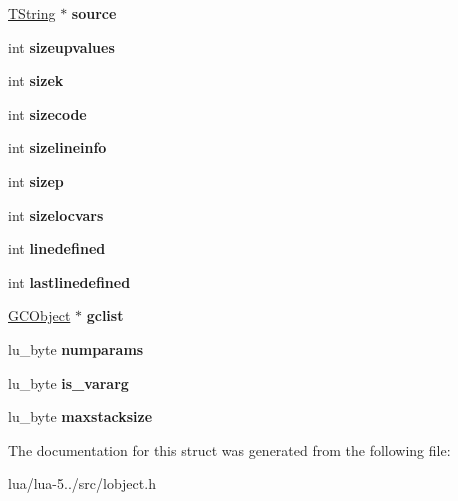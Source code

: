 \begin{DoxyCompactItemize}
\item 
\hypertarget{struct_proto_a92b6ec319e7aa1ee8b8ff7807353ad96}{\hyperlink{union_t_string}{T\+String} $\ast$ {\bfseries source}}\label{struct_proto_a92b6ec319e7aa1ee8b8ff7807353ad96}

\item 
\hypertarget{struct_proto_a6ecec897497ba7d94df6ef69289ef5c0}{int {\bfseries sizeupvalues}}\label{struct_proto_a6ecec897497ba7d94df6ef69289ef5c0}

\item 
\hypertarget{struct_proto_a5bd719e0486168f6ecd4b01bf41a7444}{int {\bfseries sizek}}\label{struct_proto_a5bd719e0486168f6ecd4b01bf41a7444}

\item 
\hypertarget{struct_proto_a43e4d3849b5859112d93bdc2534a7cc0}{int {\bfseries sizecode}}\label{struct_proto_a43e4d3849b5859112d93bdc2534a7cc0}

\item 
\hypertarget{struct_proto_a65303ae1d815313f3358a578113fcc6e}{int {\bfseries sizelineinfo}}\label{struct_proto_a65303ae1d815313f3358a578113fcc6e}

\item 
\hypertarget{struct_proto_a73ddad1a18b7c46be46ec32aa2a08632}{int {\bfseries sizep}}\label{struct_proto_a73ddad1a18b7c46be46ec32aa2a08632}

\item 
\hypertarget{struct_proto_ac2ab37e941e8866687f44f7b2f4b95a9}{int {\bfseries sizelocvars}}\label{struct_proto_ac2ab37e941e8866687f44f7b2f4b95a9}

\item 
\hypertarget{struct_proto_a62cf1c61b70bfaa4f1fb839b7398160b}{int {\bfseries linedefined}}\label{struct_proto_a62cf1c61b70bfaa4f1fb839b7398160b}

\item 
\hypertarget{struct_proto_a9ef7fae1b22b11f5a145cfee8150059c}{int {\bfseries lastlinedefined}}\label{struct_proto_a9ef7fae1b22b11f5a145cfee8150059c}

\item 
\hypertarget{struct_proto_a7991ec396b493a42b5c7f38b4e162959}{\hyperlink{union_g_c_object}{G\+C\+Object} $\ast$ {\bfseries gclist}}\label{struct_proto_a7991ec396b493a42b5c7f38b4e162959}

\item 
\hypertarget{struct_proto_a3f106f177af6c68ffd8b042713266b98}{lu\+\_\+byte {\bfseries numparams}}\label{struct_proto_a3f106f177af6c68ffd8b042713266b98}

\item 
\hypertarget{struct_proto_a82302f2e9040b681d5b34c1239dcd673}{lu\+\_\+byte {\bfseries is\+\_\+vararg}}\label{struct_proto_a82302f2e9040b681d5b34c1239dcd673}

\item 
\hypertarget{struct_proto_a9c9ed4e9d996233f75cdf56b912e4803}{lu\+\_\+byte {\bfseries maxstacksize}}\label{struct_proto_a9c9ed4e9d996233f75cdf56b912e4803}

\end{DoxyCompactItemize}


The documentation for this struct was generated from the following file\+:\begin{DoxyCompactItemize}
\item 
lua/lua-\/5../src/lobject.\+h\end{DoxyCompactItemize}
